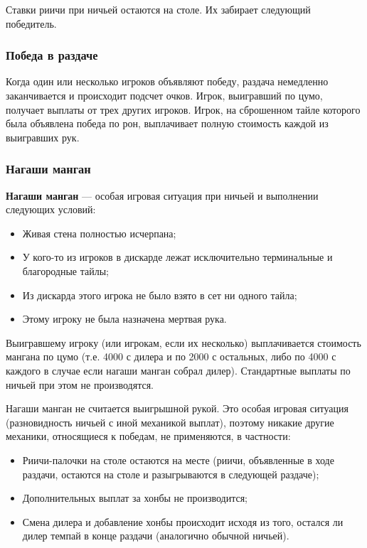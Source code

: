 Ставки риичи при ничьей остаются на столе. Их забирает следующий победитель. 

\subsubsection{Победа в раздаче}
Когда один или несколько игроков объявляют победу, раздача немедленно заканчивается и происходит подсчет очков. Игрок, выигравший по цумо, получает выплаты от трех других игроков. Игрок, на сброшенном тайле которого была объявлена победа по рон, выплачивает полную стоимость каждой из выигравших рук.

\begin{additional}

\subsubsection{Нагаши манган}

\textbf{Нагаши манган} --- особая игровая ситуация при ничьей и выполнении следующих условий:

\begin{itemize}
	\item Живая стена полностью исчерпана;
	\item У кого-то из игроков в дискарде лежат исключительно терминальные и благородные тайлы;
	\item Из дискарда этого игрока не было взято в сет ни одного тайла;
	\item Этому игроку не была назначена мертвая рука.
\end{itemize}

Выигравшему игроку (или игрокам, если их несколько) выплачивается стоимость мангана по цумо (т.е. 4000 с дилера и по 2000 с остальных, либо по 4000 с каждого в случае если нагаши манган собрал дилер). Стандартные выплаты по ничьей при этом не производятся.

Нагаши манган не считается выигрышной рукой. Это особая игровая ситуация (разновидность ничьей с иной механикой выплат), поэтому никакие другие механики, относящиеся к победам, не применяются, в частности:

\begin{itemize}
	\item Риичи-палочки на столе остаются на месте (риичи, объявленные в ходе раздачи, остаются на столе и разыгрываются в следующей раздаче);
	\item Дополнительных выплат за хонбы не производится;
	\item Смена дилера и добавление хонбы происходит исходя из того, остался ли дилер темпай в конце раздачи (аналогично обычной ничьей).
\end{itemize}


\end{additional}
